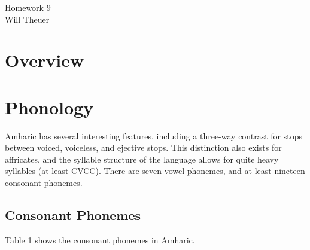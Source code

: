 \documentclass[12pt]{article}
\begin{document}
\begin{center}
{\Large Homework 9} \\
{\large Will Theuer}
\end{center}

\section{Overview}

\section{Phonology}

Amharic has several interesting features, including a three-way contrast for stops between voiced, voiceless, and ejective stops. This distinction also exists for affricates, and the syllable structure of the language allows for quite heavy syllables (at least CVCC). There are seven vowel phonemes, and at least nineteen consonant phonemes.

\subsection{Consonant Phonemes}

Table 1 shows the consonant phonemes in Amharic.
\end{document}
